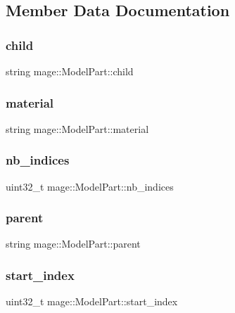 \subsection{Member Data Documentation}
\hypertarget{structmage_1_1_model_part_a3ab6e2faae44453d60cf0ff4876f49eb}{}\label{structmage_1_1_model_part_a3ab6e2faae44453d60cf0ff4876f49eb} 
\subsubsection{\texorpdfstring{child}{child}}
{\footnotesize\ttfamily string mage\+::\+Model\+Part\+::child}

\hypertarget{structmage_1_1_model_part_a4b0bfbb9ac313b6ffe8a8a3ee27469fd}{}\label{structmage_1_1_model_part_a4b0bfbb9ac313b6ffe8a8a3ee27469fd} 
\subsubsection{\texorpdfstring{material}{material}}
{\footnotesize\ttfamily string mage\+::\+Model\+Part\+::material}

\hypertarget{structmage_1_1_model_part_a4b7d8beddffa117e1f6829e6c9acfce3}{}\label{structmage_1_1_model_part_a4b7d8beddffa117e1f6829e6c9acfce3} 
\subsubsection{\texorpdfstring{nb\+\_\+indices}{nb\_indices}}
{\footnotesize\ttfamily uint32\+\_\+t mage\+::\+Model\+Part\+::nb\+\_\+indices}

\hypertarget{structmage_1_1_model_part_abd5387d6a21aa47bce04565c5333f83e}{}\label{structmage_1_1_model_part_abd5387d6a21aa47bce04565c5333f83e} 
\subsubsection{\texorpdfstring{parent}{parent}}
{\footnotesize\ttfamily string mage\+::\+Model\+Part\+::parent}

\hypertarget{structmage_1_1_model_part_af889f5bd847555d544d0ee07187e0115}{}\label{structmage_1_1_model_part_af889f5bd847555d544d0ee07187e0115} 
\subsubsection{\texorpdfstring{start\+\_\+index}{start\_index}}
{\footnotesize\ttfamily uint32\+\_\+t mage\+::\+Model\+Part\+::start\+\_\+index}

